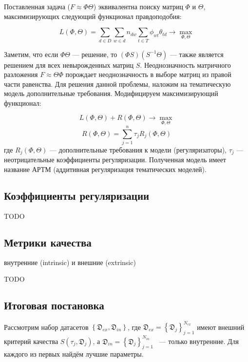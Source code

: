 \documentclass[12pt,twoside]{article}
\begin{document}

Поставленная задача ($F \approx \Phi \Theta$) эквивалентна поиску матриц $\Phi$ и $\Theta$, максимизирующих следующий функционал правдоподобия:

\begin{equation}\label{eq_1}
L(\Phi, \Theta) = \sum_{d \in D} \sum_{w \in d} n_{dw} \sum_{t \in T} \phi_{wt} \theta_{td} \rightarrow \max_{\Phi, \Theta}
\end{equation}

Заметим, что если $\Phi \Theta$ --- решение, то $(\Phi S ) (S^{-1}\Theta)$ --- также является решением для всех невырожденных матриц $S$. Неоднозначность матричного разложения  $F \approx \Theta \Phi$ порождает неоднозначность в
выборе матриц из правой части равенства. Для решения данной проблемы, наложим
на тематическую модель дополнительные требования. Модифицируем максимизирующий функционал:

\begin{equation}
L(\Phi, \Theta) + R(\Phi, \Theta) \rightarrow \max_{\Phi, \Theta}
\end{equation}	
\begin{equation}	
R(\Phi, \Theta) = \sum_{j=1}^{n} \tau_j R_j(\Phi, \Theta)
\end{equation}
где $R_j(\Phi, \Theta)$ --- дополнительные требования к модели (регуляризаторы),  $\tau_j$ --- неотрицательные коэффициенты регуляризации. Полученная модель имеет название АРТМ (аддитивная регуляризация тематических моделей).

\subsection{Коэффициенты регуляризации} \label{subsec:coefs}

{\Huge TODO}

\subsection{Метрики качества}

внутренние (intrinsic) и внешние (extrinsic)

{\Huge TODO}

\subsection{Итоговая постановка}

Рассмотрим набор датасетов $\left\{\mathfrak{D}_{ex}, \mathfrak{D}_{in}\right\}$, где  $\mathfrak{D}_{ex} = \left\{\mathfrak{D}_j\right\}_{j=1}^{N_{ex}}$ имеют внешний критерий качества $S(\tau_j, \mathfrak{D}_j)$, а $\mathfrak{D}_{in} = \left\{\mathfrak{D}_j\right\}_{j=1}^{N_{in}}$~ --- только внутренние. Для каждого из первых найдём лучшие параметры.
\end{document}
